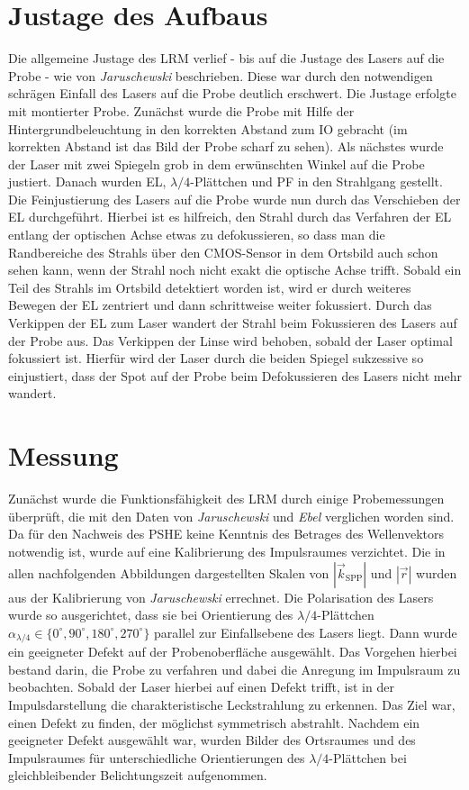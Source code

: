 \documentclass[a4paper, titlepage,  ngerman, fullpage]{book}
\begin{document}
	\section{Justage des Aufbaus}
	Die allgemeine Justage des LRM verlief - bis auf die Justage des Lasers auf die Probe - wie von \textit{Jaruschewski} \cite{Jaruschewski.2020} beschrieben. Diese war durch den notwendigen schrägen Einfall des Lasers auf die Probe deutlich erschwert. Die Justage erfolgte mit montierter Probe. Zunächst wurde die Probe mit Hilfe der Hintergrundbeleuchtung in den korrekten Abstand zum IO gebracht (im korrekten Abstand ist das Bild der Probe scharf zu sehen). Als nächstes wurde der Laser mit zwei Spiegeln grob in dem erwünschten Winkel auf die Probe justiert. Danach wurden EL, $\lambda/4$-Plättchen und PF in den Strahlgang gestellt. Die Feinjustierung des Lasers auf die Probe wurde nun durch das Verschieben der EL durchgeführt. Hierbei ist es hilfreich, den Strahl durch das Verfahren der EL entlang der optischen Achse etwas zu defokussieren, so dass man die Randbereiche des Strahls über den CMOS-Sensor in dem Ortsbild auch schon sehen kann, wenn der Strahl noch nicht exakt die optische Achse trifft. Sobald ein Teil des Strahls im Ortsbild detektiert worden ist, wird er durch weiteres Bewegen der EL zentriert und dann schrittweise weiter fokussiert. Durch das Verkippen der EL zum Laser wandert der Strahl beim Fokussieren des Lasers auf der Probe aus. Das Verkippen der Linse wird behoben, sobald der Laser optimal fokussiert ist. Hierfür wird der Laser durch die beiden Spiegel sukzessive so einjustiert, dass der Spot auf der Probe beim Defokussieren des Lasers nicht mehr wandert.
	
		
	\section{Messung}
	Zunächst wurde die Funktionsfähigkeit des LRM durch einige Probemessungen überprüft, die mit den Daten von \textit{Jaruschewski} \cite{Jaruschewski.2020} und \textit{Ebel} \cite{ebel.2019} verglichen worden sind. Da für den Nachweis des PSHE keine Kenntnis des Betrages des Wellenvektors notwendig ist, wurde auf eine Kalibrierung des Impulsraumes verzichtet. Die in allen nachfolgenden Abbildungen dargestellten Skalen von $|\vec{k}_{\mathrm{SPP}}|$ und $|\vec{r}|$ wurden aus der Kalibrierung von \textit{Jaruschewski} errechnet. Die Polarisation des Lasers wurde so ausgerichtet, dass sie bei Orientierung des $\lambda/4$-Plättchen $\alpha_{\lambda/4} \in \{0^\circ, 90^\circ, 180^\circ, 270^\circ\}$ parallel zur Einfallsebene des Lasers liegt.  Dann wurde ein geeigneter Defekt auf der Probenoberfläche ausgewählt. Das Vorgehen hierbei bestand darin, die Probe zu verfahren und dabei die Anregung im Impulsraum zu beobachten. Sobald der Laser hierbei auf einen Defekt trifft, ist in der Impulsdarstellung die charakteristische Leckstrahlung zu erkennen. Das Ziel war, einen Defekt zu finden, der möglichst symmetrisch abstrahlt. Nachdem ein geeigneter Defekt ausgewählt war, wurden Bilder des Ortsraumes und des Impulsraumes für unterschiedliche Orientierungen des $\lambda/4$-Plättchen bei gleichbleibender Belichtungszeit aufgenommen.
\end{document}
